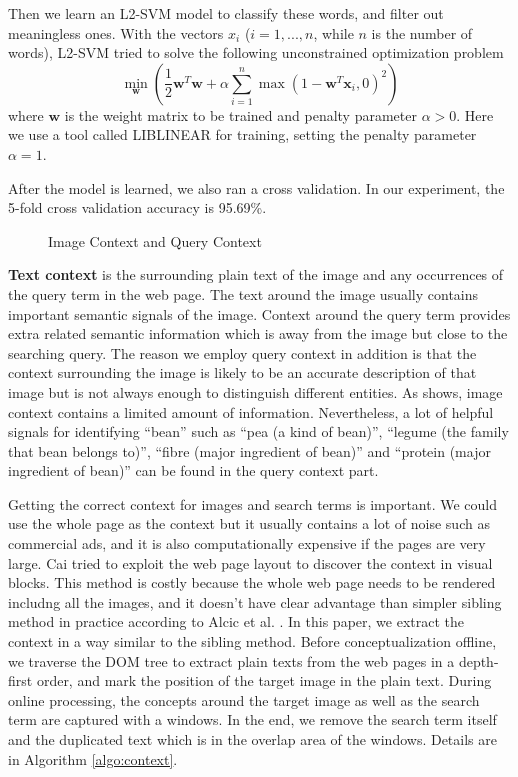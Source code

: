 Then we learn an L2-SVM model to classify these words, and filter out meaningless
ones.  With the vectors $x_i$ ($i = 1, ..., n$, while $n$ is the number of words),
L2-SVM tried to solve the following unconstrained optimization problem
\begin{equation}
\min_{\mathbf{w}}\left(\frac{1}{2}\mathbf{w}^T\mathbf{w}+
\alpha\sum_{i=1}^{n}\max(1-\mathbf{w}^T\mathbf{x}_i, 0)^2\right)
\end{equation}
where $\mathbf{w}$ is the weight matrix to be trained and penalty parameter $\alpha > 0$.
Here we use a tool called LIBLINEAR \cite{liblinear} for training,
setting the penalty parameter $\alpha = 1$.

After the model is learned, we also ran a cross validation. In our experiment,
the 5-fold cross validation accuracy is 95.69\%.

\begin{figure}[th]
	\centerline{}
	\caption{Image Context and Query Context}
	\label{fig:context-bean}
\end{figure}


\textbf{Text context} is the surrounding plain text of the image and any occurrences
of the query term in the web page. The text around the image usually contains important
semantic signals of the image.
Context around the query term provides extra related semantic information which
is away from the image but close to the searching query. The reason we employ
query context in addition is that the context surrounding the image is likely
to be an accurate description of that image but is not always enough to
distinguish different entities.
As  shows, image context contains a limited amount of
information. Nevertheless, a lot of helpful signals for identifying ``bean'' such as
``pea (a kind of bean)'',
``legume (the family that bean belongs to)'',
``fibre (major ingredient of bean)'' and
``protein (major ingredient of bean)''
can be found in the query context part.


Getting the correct context for images and search terms is important. We could use
the whole page as the context but it usually contains a lot of noise such as
commercial ads, and it is also computationally expensive if the pages are very
large. Cai\cite{Cai2004b} tried to exploit the web page layout to discover
the context in visual blocks. This method is costly because the whole web page
needs to be rendered includng all the images, and it doesn't have clear advantage
than simpler sibling method in practice according to Alcic et al. \cite{Alcic2010}.
In this paper, we extract the context in a way similar to the sibling method.
Before conceptualization offline, we traverse the DOM tree to extract plain
texts from the web pages in a depth-first order,
and mark the position of the target image in the plain text.
During online processing, the concepts around the target image as well as
the search term are captured with a windows.
In the end, we remove the search term itself and the duplicated text
which is in the overlap area of the windows.
Details are in Algorithm \ref{algo:context}.

